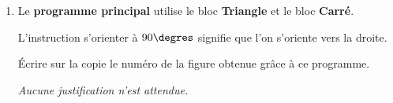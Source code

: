 \documentclass[11pt]{article}
\begin{document}
\begin{enumerate}
Donner les valeurs de \textbf{J}, \textbf{K}, \textbf{M} et \textbf{N} pour que les blocs triangle et carré permettent de construire un triangle équilatéral de 4 cm de côté et un carré de 4 cm de côté.

\emph{Aucune justification n'est attendue.}

\item Le \textbf{programme principal} utilise le bloc \textbf{Triangle} et le bloc \textbf{Carré}.

L'instruction \og s'orienter à $90\degres$ \fg{} signifie que l'on s'oriente vers la droite.

Écrire sur la copie le numéro de la figure obtenue grâce à ce programme.

\emph{Aucune justification n'est attendue.}

\noindent


\end{enumerate}
\end{document}
